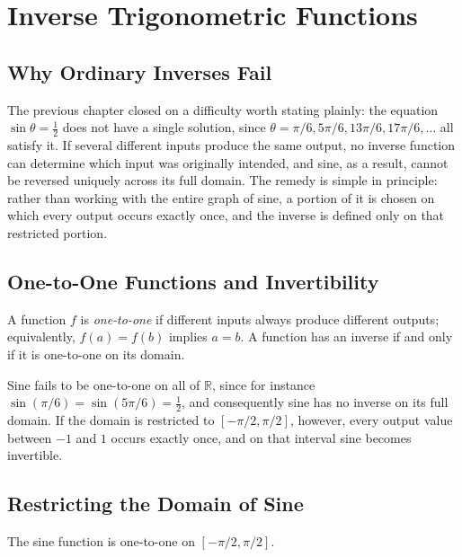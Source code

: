 \chapter{Inverse Trigonometric Functions}
\label{ch:ch07-inverse-functions}

\section{Why Ordinary Inverses Fail}

The previous chapter closed on a difficulty worth stating plainly: the
equation $\sin\theta = \tfrac12$ does not have a single solution, since
$\theta = \pi/6, 5\pi/6, 13\pi/6, 17\pi/6, \dots$ all satisfy it. If several
different inputs produce the same output, no inverse function can determine
which input was originally intended, and sine, as a result, cannot be
reversed uniquely across its full domain. The remedy is simple in
principle: rather than working with the entire graph of sine, a portion of
it is chosen on which every output occurs exactly once, and the inverse is
defined only on that restricted portion.

\section{One-to-One Functions and Invertibility}

\begin{definition}
A function $f$ is \emph{one-to-one} if different inputs always produce
different outputs; equivalently, $f(a) = f(b)$ implies $a = b$. A function
has an inverse if and only if it is one-to-one on its domain.
\end{definition}

Sine fails to be one-to-one on all of $\mathbb{R}$, since for instance
$\sin(\pi/6) = \sin(5\pi/6) = \tfrac12$, and consequently sine has no
inverse on its full domain. If the domain is restricted to
$\left[-\pi/2, \pi/2\right]$, however, every output value between $-1$ and
$1$ occurs exactly once, and on that interval sine becomes invertible.

\section{Restricting the Domain of Sine}

\begin{theorem}
The sine function is one-to-one on $\left[-\pi/2, \pi/2\right]$.
\end{theorem}


